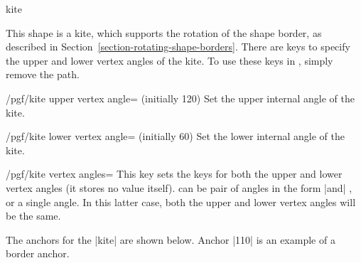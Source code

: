 \par\leavevmode
\begin{shape}{kite}

	This shape is a kite, which supports the rotation of the shape border,
	as described in Section~\ref{section-rotating-shape-borders}.
	There are \pgfname{} keys to specify the upper and lower vertex angles
	of the kite.
	To use these keys in \tikzname, simply remove the 
	path.
	
	\begin{key}{/pgf/kite upper vertex angle= (initially 120)}
	Set the upper internal angle of the kite.
	\end{key}
	
	\begin{key}{/pgf/kite lower vertex angle= (initially 60)}
	Set the lower internal angle of the kite.
	\end{key}
	
	\begin{key}{/pgf/kite vertex angles=}
		This key sets the keys for both the upper and lower vertex angles
		(it stores no value itself).
	    can be pair of angles in the form
	    |and| , or a single angle.
	   In this latter case, both the upper and lower vertex angles will
	   be the same.
	\end{key}%

\begin{codeexample}[]
\end{codeexample}


	The anchors for the |kite| are shown below. Anchor |110| is an
	example of a border anchor.
	
\begin{codeexample}[]
\Huge
{}
\end{codeexample}
\end{shape}


